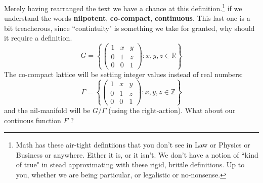 \documentclass[12pt]{article}
\begin{document}
Merely having rearranged the text we have a chance at this definition.\footnote{Math has these air-tight defintiions that you don't see in Law or Physics or Business or anywhere.  Either it is, or it isn't.  We don't have a notion of ``kind of true" in stead approximating with these rigid, brittle definitions.  Up to you, whether we are being particular, or legalistic or no-nonsense.} if we understand the words \textbf{nilpotent}, \textbf{co-compact}, \textbf{continuous}.  This last one is a bit treacherous, since ``contintuity" is something we take for granted, why should it require a definition.
$$ G = \left\{ \left( \begin{array}{ccc} 1 & x & y \\ 0 & 1 & z \\ 0 & 0 & 1 \end{array} \right) : x, y , z \in \mathbb{R} \right\}$$
The co-compact lattice will be setting integer values instead of real numbers:
$$ \Gamma = \left\{ \left( \begin{array}{ccc} 1 & x & y \\ 0 & 1 & z \\ 0 & 0 & 1 \end{array} \right) : x, y , z \in \mathbb{Z} \right\} $$
and the nil-manifold will be $G/\Gamma$ (using the right-action).  What about our contiuous function $F$ ? 

\newpage
\end{document}
